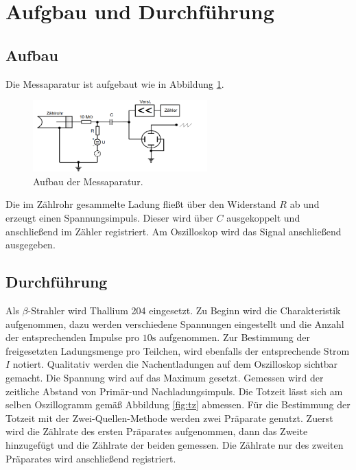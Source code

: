\section{Aufgbau und Durchführung}
\label{sec:Durchführung}
\subsection{Aufbau}
Die Messaparatur ist aufgebaut wie in Abbildung \ref{fig:aufbau}.
\begin{figure}
  \centering
  \includegraphics[width=0.6\textwidth]{aufbau.PNG}
  \caption{Aufbau der Messaparatur.}
  \label{fig:aufbau}
\end{figure}
Die im Zählrohr gesammelte Ladung fließt über den Widerstand $R$ ab und erzeugt einen Spannungsimpuls. Dieser wird über $C$ ausgekoppelt und
anschließend im Zähler registriert. Am Oszilloskop wird das Signal anschließend ausgegeben.
\subsection{Durchführung}
Als $\beta$-Strahler wird Thallium 204 eingesetzt.
Zu Beginn wird die Charakteristik aufgenommen, dazu werden verschiedene Spannungen eingestellt und die Anzahl der entsprechenden
Impulse pro $10\si{\second}$ aufgenommen. Zur Bestimmung der freigesetzten Ladungsmenge pro Teilchen, wird ebenfalls der entsprechende
Strom $I$ notiert.
Qualitativ werden die Nachentladungen auf dem Oszilloskop sichtbar gemacht. Die Spannung wird auf das Maximum gesetzt. Gemessen
wird der zeitliche Abstand von Primär-und Nachladungsimpuls. Die Totzeit lässt sich am selben
Oszillogramm gemäß Abbildung \ref{fig:tz} abmessen.
Für die Bestimmung der Totzeit mit der Zwei-Quellen-Methode werden zwei Präparate genutzt. Zuerst wird die Zählrate
des ersten Präparates aufgenommen, dann das Zweite hinzugefügt und die Zählrate der beiden gemessen. Die Zählrate nur des zweiten Präparates
wird anschließend registriert.
